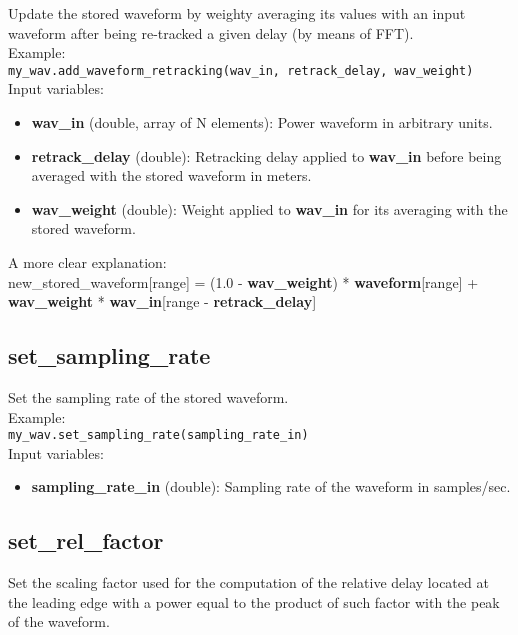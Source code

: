 Update the stored waveform by weighty averaging its values with an input waveform after being re-tracked a given delay (by means of FFT).\\

Example:\\

\texttt{my\_wav.add\_waveform\_retracking(wav\_in, retrack\_delay, wav\_weight)}\\

Input variables:
\begin{itemize}
\item {\bf wav\_in} (double, array of N elements): Power waveform in arbitrary units.
\item {\bf retrack\_delay} (double): Retracking delay applied to {\bf wav\_in} before being averaged with the stored waveform in meters.
\item {\bf wav\_weight} (double): Weight applied to {\bf wav\_in} for its averaging with the stored waveform. 
\end{itemize}

A more clear explanation:\\

new\_stored\_waveform[range] = (1.0 - {\bf wav\_weight}) * {\bf waveform}[range] + {\bf wav\_weight} * {\bf wav\_in}[range - {\bf retrack\_delay}]


\subsection{set\_sampling\_rate}

Set the sampling rate of the stored waveform.\\

Example:\\

\texttt{my\_wav.set\_sampling\_rate(sampling\_rate\_in)}\\

Input variables:
\begin{itemize}
\item {\bf sampling\_rate\_in} (double): Sampling rate of the waveform in samples/sec.
\end{itemize}


\subsection{set\_rel\_factor}

Set the scaling factor used for the computation of the relative delay located at the leading edge with a power equal to the product of such factor with the peak of the waveform.\\

